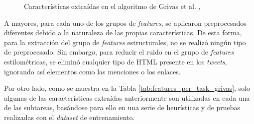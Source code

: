 \bigskip
\begin{figure}[H]
	\centering
	\caption{Características extraídas en el algoritmo de Grivas et al. \cite{grivas2015author}, }
	\label{fig:features_grivas}
\end{figure}

\bigskip
A mayores, para cada uno de los grupos de \textit{features}, se aplicaron preprocesados diferentes debido a la naturaleza de las propias características. De esta forma, para la extracción del grupo de \textit{features}
estructurales, no se realizó ningún tipo de preprocesado. Sin embargo, para reducir el ruido en el grupo de \textit{features} estilométricas, se eliminó cualquier tipo de HTML presente en los \textit{tweets}, ignorando así
elementos como las menciones o los enlaces.

\bigskip
Por otro lado, como se muestra en la Tabla \ref{tab:features_per_task_grivas}, solo algunas de las características extraídas anteriormente son utilizadas en cada una de las subtareas, basándose
para ello en una serie de heurísticas y de pruebas realizadas con el \textit{dataset} de entrenamiento.

